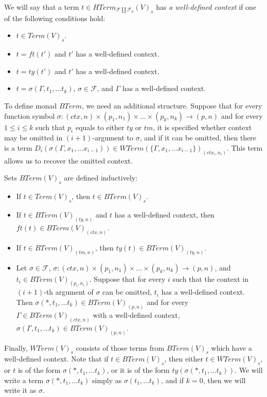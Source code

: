 \documentclass{elsarticle}
\theoremstyle{definition}
\theoremstyle{remark}
\numberwithin{figure}{section}
\begin{document}
We will say that a term $t \in HTerm_{\mathcal{F} \amalg \mathcal{F}_0}(V)_s$ has \emph{a well-defined context} if one of the following conditions hold:
\begin{itemize}
\item $t \in Term(V)_s$.
\item $t = ft(t')$ and $t'$ has a well-defined context.
\item $t = ty(t')$ and $t'$ has a well-defined context.
\item $t = \sigma(\Gamma, t_1, \ldots t_k)$, $\sigma \in \mathcal{F}$, and $\Gamma$ has a well-defined context.
\end{itemize}

To define monad $BTerm$, we need an additional structure.
Suppose that for every function symbol $\sigma : (ctx,n) \times (p_1,n_1) \times \ldots \times (p_k,n_k) \to (p,n)$
    and for every $1 \leq i \leq k$ such that $p_i$ equals to either $ty$ or $tm$, it is specified whether context may be omitted in $(i+1)$-argument to $\sigma$,
    and if it can be omitted, then there is a term $D_i(\sigma(\Gamma, x_1, \ldots x_{i-1})) \in WTerm(\{ \Gamma, x_1, \ldots x_{i-1} \})_{(ctx_i,n_i)}$.
This term allows us to recover the omitted context.

Sets $BTerm(V)_s$ are defined inductively:
\begin{itemize}
\item If $t \in Term(V)_s$, then $t \in BTerm(V)_s$.
\item If $t \in BTerm(V)_{(ty,n)}$ and $t$ has a well-defined context, then $ft(t) \in BTerm(V)_{(ctx,n)}$.
\item If $t \in BTerm(V)_{(tm,n)}$, then $ty(t) \in BTerm(V)_{(ty,n)}$.
\item Let $\sigma \in \mathcal{F}$, $\sigma : (ctx,n) \times (p_1,n_1) \times \ldots \times (p_k,n_k) \to (p,n)$, and $t_i \in BTerm(V)_{(p_i,n_i)}$.
    Suppose that for every $i$ such that the context in $(i+1)$-th argument of $\sigma$ can be omitted, $t_i$ has a well-defined context.
    Then $\sigma(*, t_1, \ldots t_k) \in BTerm(V)_{(p,n)}$ and for every $\Gamma \in BTerm(V)_{(ctx,n)}$
        with a well-defined context, $\sigma(\Gamma, t_1, \ldots t_k) \in BTerm(V)_{(p,n)}$.
\end{itemize}

Finally, $WTerm(V)_s$ consists of those terms from $BTerm(V)_s$ which have a well-defined context.
Note that if $t \in BTerm(V)_s$, then either $t \in WTerm(V)_s$, or $t$ is of the form $\sigma(*, t_1, \ldots t_k)$, or it is of the form $ty(\sigma(*, t_1, \ldots t_k))$.
We will write a term $\sigma(*, t_1, \ldots t_k)$ simply as $\sigma(t_1, \ldots t_k)$, and if $k = 0$, then we will write it as $\sigma$.
\end{document}
